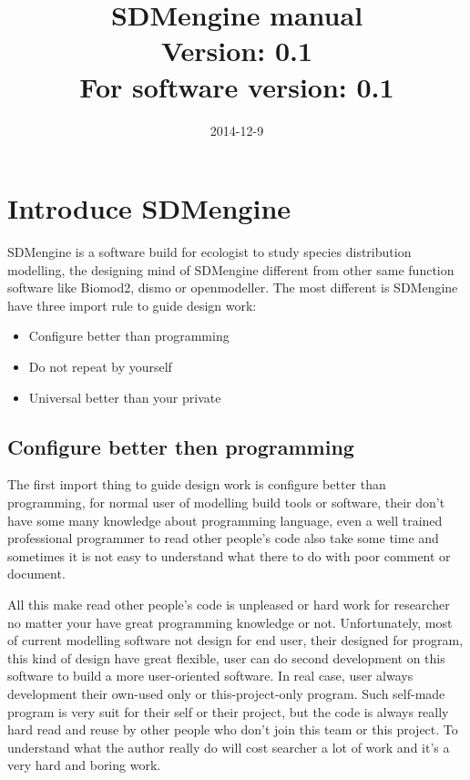 \documentclass[10pt,a4paper]{report}
\begin{document}
\title{SDMengine manual\\{\small Version: 0.1}\\{\small For software version: 0.1}}
\author{}
\date{2014-12-9}
\maketitle
\chapter{Introduce SDMengine}
SDMengine is a software build for ecologist to study species distribution modelling, the designing mind of SDMengine different from other same function software like Biomod2, dismo or openmodeller. The most different is SDMengine have three import rule to guide design work:
\begin{itemize}
\item Configure better than programming
\item Do not repeat by yourself
\item Universal better than your private
\end{itemize}


\section{Configure better then programming}
The first import thing to guide design work is configure better than programming, for normal user of modelling build tools or software, their don't have some many knowledge about programming language, even a well trained professional programmer to read other people's code also take some time and sometimes it is not easy to understand what there to do with poor comment or document.

All this make read other people's code is unpleased or hard work for researcher no matter your have great programming knowledge or not. Unfortunately, most of current modelling software not design for end user, their designed for program, this kind of design have great flexible, user can do second development on this software to build a more user-oriented software. In real case, user always development their own-used only or this-project-only program. Such self-made program is very suit for their self or their project, but the code is always really hard read and reuse by other people who don't join this team or this project. To understand what the author really do will cost searcher a lot of work and it's a very hard and boring work.
\end{document}
